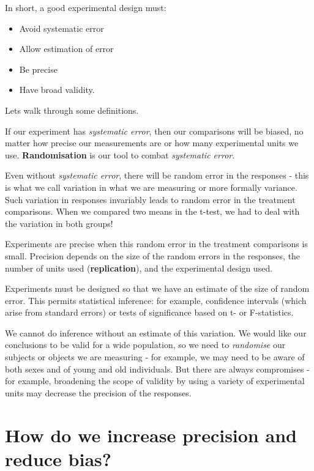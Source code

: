 \documentclass[
]{book}
\providecommand{\tightlist}{%
  \setlength{\itemsep}{0pt}\setlength{\parskip}{0pt}}
\begin{document}
In short, a good experimental design must:

\begin{itemize}
\tightlist
\item
  Avoid systematic error
\item
  Allow estimation of error
\item
  Be precise
\item
  Have broad validity.
\end{itemize}

Lets walk through some definitions.

If our experiment has \emph{systematic error}, then our comparisons will be biased, no matter how precise our measurements are or how many experimental units we use. \textbf{Randomisation} is our tool to combat \emph{systematic error}.

Even without \emph{systematic error}, there will be random error in the responses - this is what we call variation in what we are measuring or more formally variance. Such variation in responses invariably leads to random error in the treatment comparisons. When we compared two means in the t-test, we had to deal with the variation in both groups!

Experiments are precise when this random error in the treatment comparisons is small. Precision depends on the size of the random errors in the responses, the number of units used (\textbf{replication}), and the experimental design used.

Experiments must be designed so that we have an estimate of the size of random error. This permits statistical inference: for example, confidence intervals (which arise from standard errors) or tests of significance based on t- or F-statistics.

We cannot do inference without an estimate of this variation. We would like our conclusions to be valid for a wide population, so we need to \emph{randomise} our subjects or objects we are measuring - for example, we may need to be aware of both sexes and of young and old individuals. But there are always compromises - for example, broadening the scope of validity by using a variety of experimental units may decrease the precision of the responses.

\hypertarget{how-do-we-increase-precision-and-reduce-bias}{%
\section{How do we increase precision and reduce bias?}\label{how-do-we-increase-precision-and-reduce-bias}}
\end{document}
